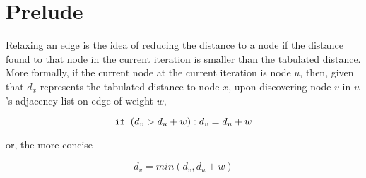 
\section{Prelude}

\begin{theorem} 

Relaxing an edge is the idea of reducing the distance to a node if the distance found to that node in the current iteration is smaller than the tabulated distance. \\

More formally, if the current node at the current iteration is node $u$, then, given that $d_x$ represents the tabulated distance to node $x$, upon discovering node $v$ in $u$'s adjacency list on edge of weight $w$,

\[
    \texttt{if } (d_v > d_u + w): \\
        d_v = d_u + w
\]

or, the more concise

$$d_v = min(d_v, d_u + w)$$

\end{theorem}